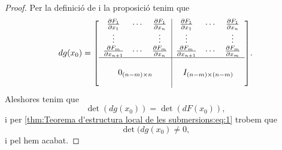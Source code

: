 \documentclass[../../Main.tex]{subfiles}
\begin{document}
\begin{theorem}
\begin{proof}
			Per la definició de  i la proposició  tenim que
			\[dg(x_{0})=\left[\begin{array}{c|c}
				\begin{matrix}
					\frac{\partial F_{1}}{\partial x_{1}} & \cdots & \frac{\partial F_{1}}{\partial x_{n}} \\
					\vdots & & \vdots \\
					\frac{\partial F_{m}}{\partial x_{n+1}} & \cdots & \frac{\partial F_{m}}{\partial x_{n}}
				\end{matrix} & \begin{matrix}
					\frac{\partial F_{1}}{\partial x_{1}} & \cdots & \frac{\partial F_{1}}{\partial x_{n}} \\
					\vdots & & \vdots \\
					\frac{\partial F_{m}}{\partial x_{n+1}} & \cdots & \frac{\partial F_{m}}{\partial x_{m}}
				\end{matrix} \\ \hline \\
				0_{(n-m)\times n} & I_{(n-m)\times(n-m)} \\
				&
			\end{array}\right].\]
			Aleshores tenim que
			\[\det(dg(x_{0}))=\det(dF(x_{0})),\]
			i per \eqref{thm:Teorema d'estructura local de les submersions:eq:1} trobem que
			\[\det(dg(x_{0})\neq0,\]
			i pel  hem acabat.
		\end{proof}
	\end{theorem}
\end{document}
